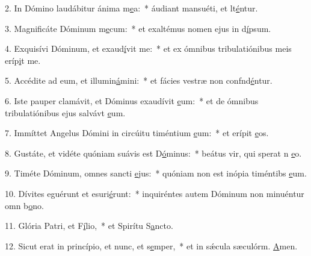 2. In Dómino laudábitur ánima m\uline{e}a:~* áudiant mansuéti, et lt\uline{é}ntur.\par 
3. Magnificáte Dóminum m\uline{e}cum:~* et exaltémus nomen ejus in d\uline{í}psum.\par 
4. Exquisívi Dóminum, et exaud\uline{í}vit me:~* et ex ómnibus tribulatiónibus meis eríp\uline{i}t me.\par 
5. Accédite ad eum, et illumin\uline{á}mini:~* et fácies vestræ non confnd\uline{é}ntur.\par 
6. Iste pauper clamávit, et Dóminus exaudívit \uline{e}um:~* et de ómnibus tribulatiónibus ejus salvávt \uline{e}um.\par 
7. Immíttet Angelus Dómini in circúitu timéntium \uline{e}um:~* et erípit \uline{e}os.\par 
8. Gustáte, et vidéte quóniam suávis est D\uline{ó}minus:~* beátus vir, qui sperat n \uline{e}o.\par 
9. Timéte Dóminum, omnes sancti \uline{e}jus:~* quóniam non est inópia timéntibs \uline{e}um.\par 
10. Dívites eguérunt et esuri\uline{é}runt:~* inquiréntes autem Dóminum non minuéntur omn b\uline{o}no.\par 
11. Glória Patri, et F\uline{í}lio,~* et Spirítu S\uline{a}ncto.\par 
12. Sicut erat in princípio, et nunc, et s\uline{e}mper,~* et in sǽcula sæculórm. \uline{A}men.\par 
